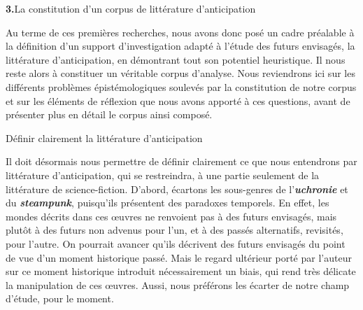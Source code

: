 \documentclass[letterpaper,portrait,12pt]{article}
\begin{document}
\textbf{{\Large 3.}}{\Large  La constitution d'un corpus de litt\'{e}rature d'anticipation}








{\Large 	}Au terme de ces premi\`{e}res recherches, nous avons donc pos\'{e} un cadre pr\'{e}alable \`{a} la d\'{e}finition d'un support d'investigation adapt\'{e} \`{a} l'\'{e}tude des futurs envisag\'{e}s, la litt\'{e}rature d'anticipation, en d\'{e}montrant tout son potentiel heuristique. Il nous reste alors \`{a} constituer un v\'{e}ritable corpus d'analyse. Nous reviendrons ici sur les diff\'{e}rents probl\`{e}mes \'{e}pist\'{e}mologiques soulev\'{e}s par la constitution de notre corpus et sur les \'{e}l\'{e}ments de r\'{e}flexion que nous avons apport\'{e} \`{a} ces questions, avant de pr\'{e}senter plus en d\'{e}tail le corpus ainsi compos\'{e}.








	D\'{e}finir clairement la litt\'{e}rature d'anticipation





	Il doit d\'{e}sormais nous permettre de d\'{e}finir clairement ce que nous entendrons par litt\'{e}rature d'anticipation, qui se restreindra, \`{a} une partie seulement de la litt\'{e}rature de science-fiction. D'abord, \'{e}cartons les sous-genres de l'\textbf{\emph{uchronie}}\textbf{ }et du \textbf{\emph{steampunk}},\textbf{\emph{ }}puisqu'ils pr\'{e}sentent des paradoxes temporels. En effet, les mondes d\'{e}crits dans ces \oe{}uvres ne renvoient pas \`{a} des futurs envisag\'{e}s, mais plut\^{o}t \`{a} des futurs non advenus pour l'un, et \`{a} des pass\'{e}s alternatifs, revisit\'{e}s, pour l'autre. On pourrait avancer qu'ils d\'{e}crivent des futurs envisag\'{e}s du point de vue d'un moment historique pass\'{e}. Mais le regard ult\'{e}rieur port\'{e} par l'auteur sur ce moment historique introduit n\'{e}cessairement un biais, qui rend tr\`{e}s d\'{e}licate la manipulation de ces \oe{}uvres. Aussi, nous pr\'{e}f\'{e}rons les \'{e}carter de notre champ d'\'{e}tude, pour le moment. 
\end{document}
